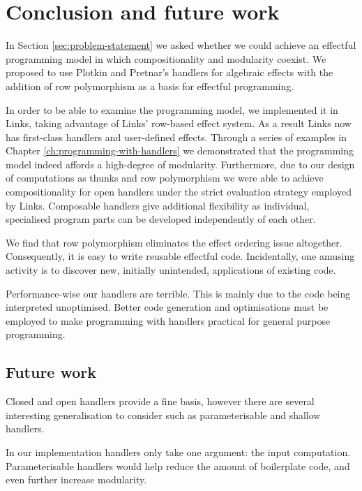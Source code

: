 \chapter{Conclusion and future work}\label{ch:conclusion}
In Section \ref{sec:problem-statement} we asked whether we could achieve an effectful programming model in which compositionality and modularity coexist. We proposed to use Plotkin and Pretnar's handlers for algebraic effects \cite{Plotkin2013} with the addition of row polymorphism as a basis for effectful programming. 

In order to be able to examine the programming model, we implemented it in Links, taking advantage of Links' row-based effect system. As a result Links now has first-class handlers and user-defined effects.
Through a series of examples in Chapter \ref{ch:programming-with-handlers} we demonstrated that the programming model indeed affords a high-degree of modularity. Furthermore, due to our design of computations as thunks and row polymorphism we were able to achieve compositionality for open handlers under the strict evaluation strategy employed by Links. Composable handlers give additional flexibility as individual, specialised program parts can be developed independently of each other.

We find that row polymorphism eliminates the effect ordering issue altogether. Consequently, it is easy to write reusable effectful code. Incidentally, one amusing activity is to discover new, initially unintended, applications of existing code.

Performance-wise our handlers are terrible. This is mainly due to the code being interpreted unoptimised. Better code generation and optimisations must be employed to make programming with handlers practical for general purpose programming.

\section{Future work}
Closed and open handlers provide a fine basis, however there are several interesting generalisation to consider such as parameterisable and shallow handlers. 

In our implementation handlers only take one argument: the input computation. Parameterisable handlers would help reduce the amount of boilerplate code, and even further increase modularity. %

